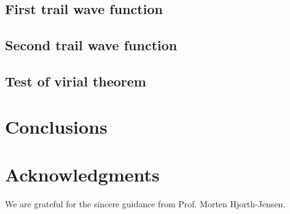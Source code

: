 \documentclass{article}
\begin{document}
	\subsection{First trail wave function}
	


	\subsection{Second trail wave function}
	

	
	\subsection{Test of virial theorem}
	

	
\section{Conclusions}\label{conclude}
	
	
	\section*{Acknowledgments}
	We are grateful for the sincere guidance from Prof. Morten Hjorth-Jensen. 
	
	\nocite{*} 
	
	
\end{document}
